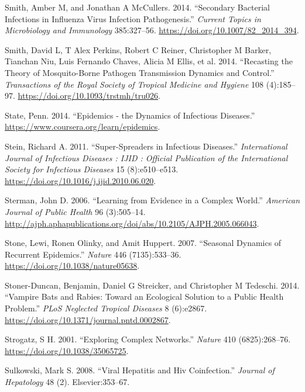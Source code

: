\documentclass[]{book}
\theoremstyle{definition}
\theoremstyle{definition}
\theoremstyle{definition}
\theoremstyle{remark}
\begin{document}
\leavevmode\hypertarget{ref-smith14a}{}%
Smith, Amber M, and Jonathan A McCullers. 2014. ``Secondary Bacterial
Infections in Influenza Virus Infection Pathogenesis.'' \emph{Current
Topics in Microbiology and Immunology} 385:327--56.
\url{https://doi.org/10.1007/82_2014_394}.

\leavevmode\hypertarget{ref-smith14}{}%
Smith, David L, T Alex Perkins, Robert C Reiner, Christopher M Barker,
Tianchan Niu, Luis Fernando Chaves, Alicia M Ellis, et al. 2014.
``Recasting the Theory of Mosquito-Borne Pathogen Transmission Dynamics
and Control.'' \emph{Transactions of the Royal Society of Tropical
Medicine and Hygiene} 108 (4):185--97.
\url{https://doi.org/10.1093/trstmh/tru026}.

\leavevmode\hypertarget{ref-epimooc}{}%
State, Penn. 2014. ``Epidemics - the Dynamics of Infectious Diseases.''
\url{https://www.coursera.org/learn/epidemics}.

\leavevmode\hypertarget{ref-stein11}{}%
Stein, Richard A. 2011. ``Super-Spreaders in Infectious Diseases.''
\emph{International Journal of Infectious Diseases : IJID : Official
Publication of the International Society for Infectious Diseases} 15
(8):e510--e513. \url{https://doi.org/10.1016/j.ijid.2010.06.020}.

\leavevmode\hypertarget{ref-sterman06}{}%
Sterman, John D. 2006. ``Learning from Evidence in a Complex World.''
\emph{American Journal of Public Health} 96 (3):505--14.
\url{http://ajph.aphapublications.org/doi/abs/10.2105/AJPH.2005.066043}.

\leavevmode\hypertarget{ref-stone07}{}%
Stone, Lewi, Ronen Olinky, and Amit Huppert. 2007. ``Seasonal Dynamics
of Recurrent Epidemics.'' \emph{Nature} 446 (7135):533--36.
\url{https://doi.org/10.1038/nature05638}.

\leavevmode\hypertarget{ref-stoner-duncan14}{}%
Stoner-Duncan, Benjamin, Daniel G Streicker, and Christopher M Tedeschi.
2014. ``Vampire Bats and Rabies: Toward an Ecological Solution to a
Public Health Problem.'' \emph{PLoS Neglected Tropical Diseases} 8
(6):e2867. \url{https://doi.org/10.1371/journal.pntd.0002867}.

\leavevmode\hypertarget{ref-strogatz01}{}%
Strogatz, S H. 2001. ``Exploring Complex Networks.'' \emph{Nature} 410
(6825):268--76. \url{https://doi.org/10.1038/35065725}.

\leavevmode\hypertarget{ref-sulkowski08}{}%
Sulkowski, Mark S. 2008. ``Viral Hepatitis and Hiv Coinfection.''
\emph{Journal of Hepatology} 48 (2). Elsevier:353--67.
\end{document}
